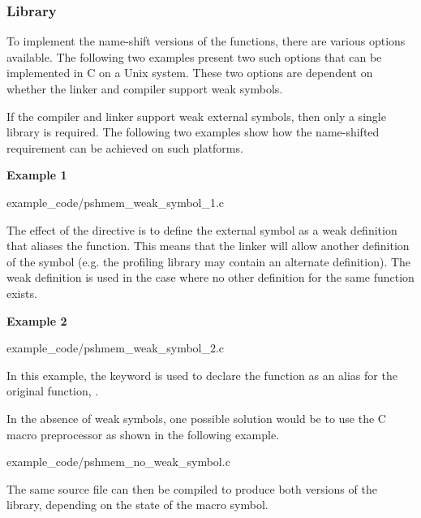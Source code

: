 \subsubsection{\openshmem Library}
\label{sec:pshmem_example_library}
To implement the name-shift versions of the \openshmem functions, 
there are various options available. The following two examples 
present two such options that can be implemented in C on a Unix 
system. These two options are dependent on whether the linker 
and compiler support weak symbols. 

If the compiler and linker support weak external symbols, then 
only a single library is required. The following two examples show 
how the name-shifted requirement can be achieved on such platforms. 

\noindent\textbf{Example 1}


      {example_code/pshmem_weak_symbol_1.c}

The effect of the  directive is to define the 
external symbol  as a weak definition that 
aliases the  function. This 
means that the linker will allow another definition 
of the symbol (e.g. the profiling library may contain an alternate 
definition). The weak definition is used in the case where no other 
definition for the same function exists. 

\noindent\textbf{Example 2}


      {example_code/pshmem_weak_symbol_2.c}

In this example, the keyword  is used to 
declare the  function as an alias for 
the original function, .

In the absence of weak symbols, one possible solution would be to 
use the C macro preprocessor as shown in the following example. 


      {example_code/pshmem_no_weak_symbol.c}

The same source file can then be compiled to produce both versions 
of the library, depending on the state of the 
 macro symbol.

